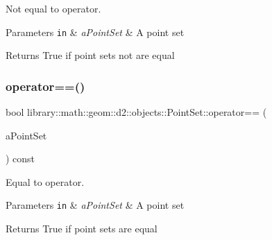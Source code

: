 Not equal to operator. 


\begin{DoxyParams}[1]{Parameters}
\mbox{\tt in}  & {\em a\+Point\+Set} & A point set \\
\hline
\end{DoxyParams}
\begin{DoxyReturn}{Returns}
True if point sets not are equal 
\end{DoxyReturn}
\mbox{\label{classlibrary_1_1math_1_1geom_1_1d2_1_1objects_1_1_point_set_a0e0187a6f35dadf000b69615b9b82cde}} 
\subsubsection{\texorpdfstring{operator==()}{operator==()}}
{\footnotesize\ttfamily bool library\+::math\+::geom\+::d2\+::objects\+::\+Point\+Set\+::operator== (\begin{DoxyParamCaption}\item[{const \hyperlink{classlibrary_1_1math_1_1geom_1_1d2_1_1objects_1_1_point_set}{Point\+Set} \&}]{a\+Point\+Set }\end{DoxyParamCaption}) const}



Equal to operator. 


\begin{DoxyParams}[1]{Parameters}
\mbox{\tt in}  & {\em a\+Point\+Set} & A point set \\
\hline
\end{DoxyParams}
\begin{DoxyReturn}{Returns}
True if point sets are equal 
\end{DoxyReturn}
\mbox{\label{classlibrary_1_1math_1_1geom_1_1d2_1_1objects_1_1_point_set_a652098938854c19294b5df8e8634cc9a}} 
